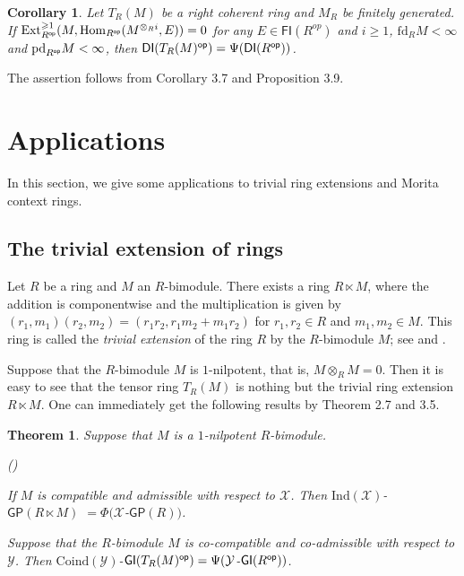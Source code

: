 \documentclass[10pt,twoside]{amsart}
\theoremstyle{bfupright head,slanted body}
\theoremstyle{bfupright head,upright body}
\theoremstyle{fixed bf head,slanted body}
\newtheorem{thm}[res]{Theorem}          \newtheorem*{thm*}{Theorem}
\newtheorem{cor}[res]{Corollary}        \newtheorem*{cor*}{Corollary}
\theoremstyle{fixed bf head,upright body}
\theoremstyle{numbered paragraph}
\newlength{\thmlistleft}        %
\newlength{\thmlistright}       %
\newlength{\thmlistpartopsep}   %
\newlength{\thmlisttopsep}      %
\newlength{\thmlistparsep}      %
\newlength{\thmlistitemsep}     %
\newcounter{rqm}
\newenvironment{rqm}{\begin{list}{\upshape (\arabic{rqm})}%
    {\usecounter{rqm}%
      \setlength{\leftmargin}{\thmlistleft}%
      \setlength{\labelwidth}{\thmlistleft}%
      \setlength{\rightmargin}{\thmlistright}%
      \setlength{\partopsep}{\thmlistpartopsep}%
      \setlength{\topsep}{\thmlisttopsep}%
      \setlength{\parsep}{\thmlistparsep}%
      \setlength{\itemsep}{\thmlistitemsep}}}%
  {\end{list}}%
\newenvironment{prf*}[1][Proof]{%
  \begin{proof}[\bf #1]
    \setcounter{equation}{0}
    \renewcommand{\theequation}{\arabic{equation}}}
  {\end{proof}
}
\numberwithin{equation}{res}
\newcommand{\GP}{\mathsf{GP}}
\newcommand{\DI}{\mathsf{DI}}
\newcommand{\GI}{\mathsf{GI}}
\newcommand{\fd}{\mathrm{fd}}
\newcommand{\pd}{\mathrm{pd}}
\newcommand{\FI}{\mathsf{FI}}
\newcommand{\Coind}{\mathrm{Coind}}
\newcommand{\Ind}{\mathrm{Ind}}
\newcommand{\Rop}{R^{\sf op}}
\newcommand{\op}{\sf op}
\newcommand{\Hom}{\operatorname{Hom}}
\newcommand{\Ext}{\operatorname{Ext}}
\begin{document}
\begin{cor} 
Let $T_R(M)$ be a right coherent ring and $M_{R}$ be finitely generated.
If $\Ext_{\Rop}^{\geqslant 1}(M, \Hom_{\Rop}(M^{\otimes_Ri}, E))=0$ for any $E\in\FI(R^{op})$ and $i\geqslant 1$,
$\fd_{R}M<\infty$and $\pd_{\Rop}M<\infty$,
then $\DI(T_R(M)^{\op}) = \Psi(\DI(\Rop))$.
\end{cor} 

\begin{prf*}
The assertion follows from Corollary 3.7 and Proposition 3.9.
\end{prf*}







\section{Applications}
\label{Applications}%
\noindent
In this section, we give some applications to
trivial ring extensions and Morita context rings.

\subsection{The trivial extension of rings}
\label{The trivial extension of rings}%
\noindent
Let $R$ be a ring and $M$ an $R$-bimodule.
There exists a ring $R\ltimes M$,
where the addition is componentwise
and the multiplication is given by
$(r_1, m_1)(r_2, m_2) = (r_1r_2,r_1m_2 + m_1r_2)$ for $r_1, r_2 \in R$ and $m_1, m_2 \in M$.
This ring is called the \emph{trivial extension} of
the ring $R$ by the $R$-bimodule $M$; see \cite{TRIEXT1975} and \cite{TRIEXT1971}.

Suppose that the $R$-bimodule $M$ is $1$-nilpotent,
that is, $M\otimes_RM=0$.
Then it is easy to see that the tensor ring $T_R(M)$
is nothing but the trivial ring extension $R\ltimes M$.
One can immediately get the following results by
Theorem 2.7 and 3.5.

\begin{thm}\label{THM GP com}
Suppose that $M$ is a $1$-nilpotent $R$-bimodule.
\begin{rqm}
\item
If $M$ is compatible and admissible with respect to $\mathcal{X}$.
Then $\Ind(\mathcal{X})$-$\GP(R\ltimes M)$ $= \Phi(\mathcal{X}$-$\GP(R))$.
\item
Suppose that the $R$-bimodule $M$ is co-compatible and co-admissible with respect to $\mathcal{Y}$.
Then $\Coind(\mathcal{Y})$-$\GI(T_R(M)^{\op}) = \Psi(\mathcal{Y}$-$\GI(\Rop))$.
\end{rqm}
\end{thm}
\end{document}
